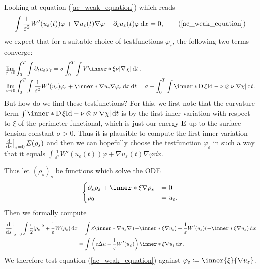 Looking at equation (\ref{ac_weak_equation}) which reads
\begin{equation*}
	\int
	\frac{ 1 }{ \varepsilon^{ 2 } } W' ( u_{ \varepsilon} ( t ) ) \varphi
	+
	\nabla u_{ \varepsilon } ( t ) \nabla \varphi
	+
	\partial_{ t } u_{ \varepsilon} ( t ) \varphi 
	\dd{x}
	=
	0,
	\tag{\ref{ac_weak_equation}}
\end{equation*}
we expect that for a suitable choice of testfunctions $ \varphi_{ \varepsilon } $, the following two terms converge:
\begin{align*}
	& \lim_{ \varepsilon \to 0 }
	\int_{ 0 }^{ T }
	\int 
	\partial_{ t } u_{ \varepsilon } \varphi_{ \varepsilon }
	=
	\sigma
	\int_{ 0 }^{ T }
	\int
	V \inner*{ \xi }{ \nu }
	\abs{ \nabla \chi }
	\dd{ t },
	\\
	& \lim_{ \varepsilon \to 0 }
	\int_{ 0 }^{ T }
	\int
	\frac{1 }{ \varepsilon^{ 2 } }
	W'( u_{ \varepsilon } )
	\varphi_{ \varepsilon}
	+ 
	\inner*{ \nabla u_{ \varepsilon } }{ \nabla \varphi_{ \varepsilon } }
	\dd{ x }
	\dd{ t }
	=
	\sigma
	- \int_{ 0 }^{ T }
	\int
	\inner*{ \diff \xi }{ \mathrm{Id} - \nu \otimes \nu }
	\abs{ \nabla \chi }
	\dd{ t }.
\end{align*}
But how do we find these testfunctions? For this, we first note that the curvature term
$ \int \inner*{ \diff \xi }{ \mathrm{Id} - \nu \otimes \nu } \abs{ \nabla \chi } \dd{ t } $ is by \cite[Thm.~17.5]{maggi_sets_of_finite_perimeter} the first inner variation with respect to $ \xi $ of the perimeter functional, which is just our energy $ \operatorname{E} $ up to the surface tension constant $ \sigma > 0 $. Thus it is plausible to compute the first inner variation 
$ \left.\dv{ s } \right|_{ s = 0 } E ( \rho_{ s } ) $ and then we can hopefully choose the testfunction $ \varphi_{ \varepsilon } $ in such a way that it equals
$ 
\int
\frac{ 1 }{ \varepsilon^{ 2 } } W' ( u_{ \varepsilon} ( t ) ) \varphi
+
\nabla u_{ \varepsilon } ( t ) \nabla \varphi
\dd{x}
$.

Thus let $ ( \rho_{ s } )_{ s } $ be functions which solve the ODE
\[
\begin{cases}
	\partial_{ s } \rho_{ s } 
	+
	\inner*{ \xi }{ \nabla \rho_{ s } }
	& = 0
	\\
	\rho_{ 0 } & = u_{ \varepsilon }.
\end{cases}
\]
Then we formally compute 
\begin{align*}
	\left.\dv{ s }\right|_{ s = 0 }
	\int
	\frac{ \varepsilon }{ 2 }
	\abs{ \rho_{ s } }^{ 2 }
	+
	\frac{ 1 }{ \varepsilon }
	W ( \rho_{ s } )
	\dd{ x }
	& =
	\int
	\varepsilon 
	\inner*{ \nabla u_{ \varepsilon } }
	{ \nabla \left( - \inner*{ \xi }{ \nabla u_{ \varepsilon } } \right) }
	+
	\frac{ 1 }{ \varepsilon }
	W'( u_{ \varepsilon } ) ( -\inner*{ \xi }{ \nabla u_{ \varepsilon } } )
	\dd{ x }
	\\
	& =
	\int
	\left(
	\varepsilon \Delta u - \frac{ 1 }{ \varepsilon } W'( u_{ \varepsilon } )
	\right)
	\inner*{ \xi }{ \nabla u_{ \varepsilon } } 
	\dd{ x }.
\end{align*}
We therefore test equation (\ref{ac_weak_equation}) against $ \varphi_{ \varepsilon } \coloneqq \inner{ \xi }{ \nabla u_{ \varepsilon } } $.

